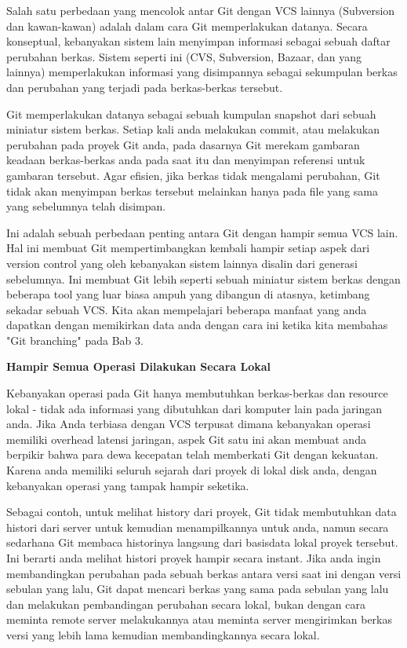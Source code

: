 Salah satu perbedaan yang mencolok antar Git dengan VCS lainnya 
(Subversion dan kawan-kawan) adalah dalam cara Git memperlakukan 
datanya. Secara konseptual, kebanyakan sistem lain menyimpan informasi 
sebagai sebuah daftar perubahan berkas. Sistem seperti ini (CVS, 
Subversion, Bazaar, dan yang lainnya) memperlakukan informasi yang 
disimpannya sebagai sekumpulan berkas dan perubahan yang terjadi pada 
berkas-berkas tersebut.\vspace{12pt}

Git memperlakukan datanya sebagai sebuah kumpulan snapshot dari sebuah 
miniatur sistem berkas. Setiap kali anda melakukan commit, atau 
melakukan perubahan pada proyek Git anda, pada dasarnya Git merekam 
gambaran keadaan berkas-berkas anda pada saat itu dan menyimpan 
referensi untuk gambaran tersebut. Agar efisien, jika berkas tidak 
mengalami perubahan, Git tidak akan menyimpan berkas tersebut melainkan 
hanya pada file yang sama yang sebelumnya telah disimpan.\vspace{12pt}

Ini adalah sebuah perbedaan penting antara Git dengan hampir semua VCS 
lain. Hal ini membuat Git mempertimbangkan kembali hampir setiap aspek 
dari version control yang oleh kebanyakan sistem lainnya disalin dari 
generasi sebelumnya. Ini membuat Git lebih seperti sebuah miniatur 
sistem berkas dengan beberapa tool yang luar biasa ampuh yang dibangun 
di atasnya, ketimbang sekadar sebuah VCS. Kita akan mempelajari beberapa 
manfaat yang anda dapatkan dengan memikirkan data anda dengan cara ini 
ketika kita membahas "Git branching" pada Bab 3.\vspace{12pt}

\textbf{Hampir Semua Operasi Dilakukan Secara Lokal}\vspace{12pt}

Kebanyakan operasi pada Git hanya membutuhkan berkas-berkas dan resource 
lokal - tidak ada informasi yang dibutuhkan dari komputer lain pada 
jaringan anda. Jika Anda terbiasa dengan VCS terpusat dimana kebanyakan 
operasi memiliki overhead latensi jaringan, aspek Git satu ini akan 
membuat anda berpikir bahwa para dewa kecepatan telah memberkati Git 
dengan kekuatan. Karena anda memiliki seluruh sejarah dari proyek di 
lokal disk anda, dengan kebanyakan operasi yang tampak hampir seketika.\vspace{12pt}

Sebagai contoh, untuk melihat history dari proyek, Git tidak membutuhkan 
data histori dari server untuk kemudian menampilkannya untuk anda, namun 
secara sedarhana Git membaca historinya langsung dari basisdata lokal 
proyek tersebut. Ini berarti anda melihat histori proyek hampir secara 
instant. Jika anda ingin membandingkan perubahan pada sebuah berkas 
antara versi saat ini dengan versi sebulan yang lalu, Git dapat mencari 
berkas yang sama pada sebulan yang lalu dan melakukan pembandingan 
perubahan secara lokal, bukan dengan cara meminta remote server 
melakukannya atau meminta server mengirimkan berkas versi yang lebih 
lama kemudian membandingkannya secara lokal.\vspace{12pt}

